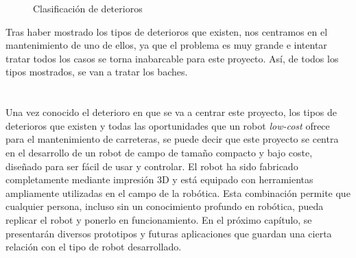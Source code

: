 \begin{figure}[H]
	\caption{Clasificación de deterioros}
	\label{fig:diagrama}
\end{figure}


Tras haber mostrado los tipos de deterioros que existen, nos centramos en el mantenimiento de uno de ellos, ya que el problema es muy grande e intentar tratar todos los casos se torna inabarcable para este proyecto. Así, de todos los tipos mostrados, se van a tratar los baches.\\\\\\  %

Una vez conocido el deterioro en que se va a centrar este proyecto, los tipos de deterioros que existen y todas las oportunidades que un robot \textit{low-cost} ofrece para el mantenimiento de carreteras, se puede decir que este proyecto se centra en el desarrollo de un robot de campo de tamaño compacto y bajo coste, diseñado para ser fácil de usar y controlar. El robot ha sido fabricado completamente mediante impresión 3D y está equipado con herramientas ampliamente utilizadas en el campo de la robótica. Esta combinación permite que cualquier persona, incluso sin un conocimiento profundo en robótica, pueda replicar el robot y ponerlo en funcionamiento. En el próximo capítulo, se presentarán diversos prototipos y futuras aplicaciones que guardan una cierta relación con el tipo de robot desarrollado.

